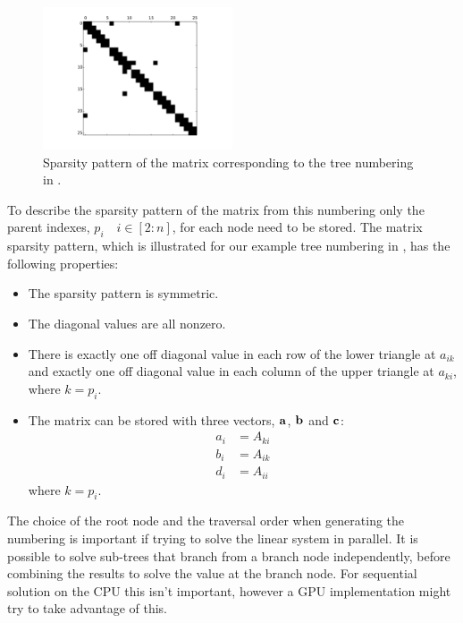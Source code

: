 \begin{figure}[htp!]
\centering
\includegraphics[width=0.5\textwidth]{./images/sparsity.pdf}
\caption{Sparsity pattern of the matrix corresponding to the tree numbering in .}
\label{fig:sparsity}
\end{figure}

To describe the sparsity pattern of the matrix from this numbering only the parent indexes, $p_i\quad i\in[2:n]$, for each node need to be stored. The matrix sparsity pattern, which is illustrated for our example tree numbering in , has the following properties:
\begin{itemize}
    \item
        The sparsity pattern is symmetric.
    \item
        The diagonal values are all nonzero.
    \item
        There is exactly one off diagonal value in each row of the lower triangle at $a_{ik}$ and exactly one off diagonal value in each column of the upper triangle at $a_{ki}$, where $k=p_i$.
    \item
        The matrix can be stored with three vectors, $\mathbf{a}$, $\mathbf{b}$ and $\mathbf{c}$:
        \begin{align}
            a_i &= A_{ki} \\
            b_i &= A_{ik} \\
            d_i &= A_{ii}
        \end{align}
        where $k=p_i$.
\end{itemize}

\begin{note}
The choice of the root node and the traversal order when generating the numbering is important if trying to solve the linear system in parallel. It is possible to solve sub-trees that branch from a branch node independently, before combining the results to solve the value at the branch node. For sequential solution on the CPU this isn't important, however a GPU implementation might try to take advantage of this.
\end{note}
